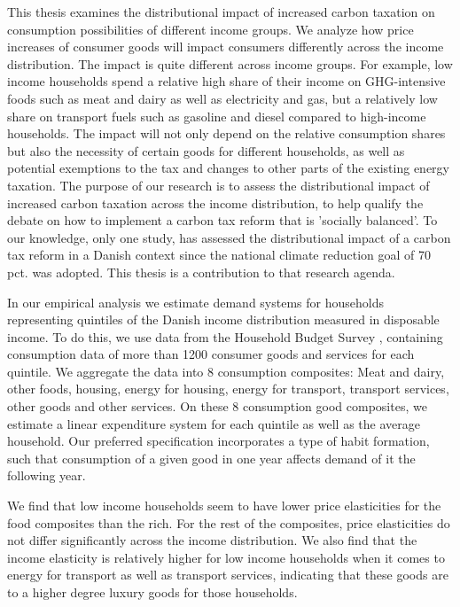 This thesis examines the distributional impact of increased carbon taxation on consumption possibilities of different income groups. We analyze how price increases of consumer goods will impact consumers differently across the income distribution. The impact is quite different across income groups. For example, low income households spend a relative high share of their income on GHG-intensive foods such as meat and dairy as well as electricity and gas, but a relatively low share on transport fuels such as gasoline and diesel compared to high-income households. The impact will not only depend on the relative consumption shares but also the necessity of certain goods for different households, as well as potential exemptions to the tax and changes to other parts of the existing energy taxation. The purpose of our research is to assess the distributional impact of increased carbon taxation across the income distribution, to help qualify the debate on how to implement a carbon tax reform that is 'socially balanced'. To our knowledge, only one study, \cite{Kraka2020} has assessed the distributional impact of a carbon tax reform in a Danish context since the national climate reduction goal of 70 pct. was adopted. This thesis is a contribution to that research agenda.

In our empirical analysis we estimate demand systems for households representing quintiles of the Danish income distribution measured in disposable income. To do this, we use data from the Household Budget Survey \citep{hhbudgetsurvey}, containing consumption data of more than 1200 consumer goods and services for each quintile. We aggregate the data into 8 consumption composites: Meat and dairy, other foods, housing, energy for housing, energy for transport, transport services, other goods and other services. On these 8 consumption good composites, we estimate a linear expenditure system \citep{stone1954linear} for each quintile as well as the average household. Our preferred specification incorporates a type of habit formation, such that consumption of a given good in one year affects demand of it the following year.

We find that low income households seem to have lower price elasticities for the food composites than the rich. For the rest of the composites, price elasticities do not differ significantly across the income distribution. We also find that the income elasticity is relatively higher for low income households when it comes to energy for transport as well as transport services, indicating that these goods are to a higher degree luxury goods for those households.

